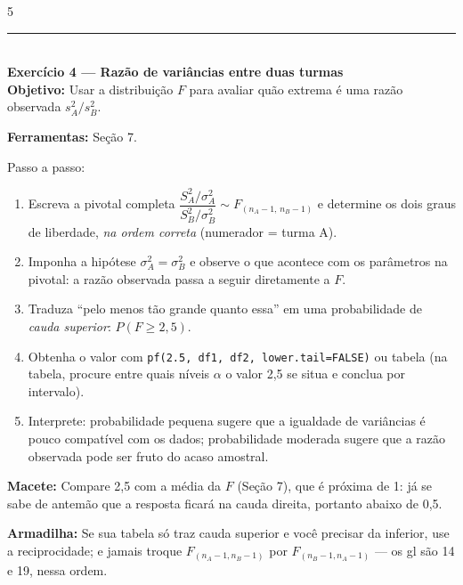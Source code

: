 \documentclass[a4paper,8pt]{extarticle}
\newcommand{\tit}[1]{\vspace{2pt}\textcolor{azul}{\rule{\linewidth}{0.6pt}}\\[1pt]\textbf{\textcolor{azul}{#1}}\\[1pt]}
\newcommand{\mac}[1]{\textcolor{verde}{\textbf{Macete:}} #1\par}
\newcommand{\arm}[1]{\textcolor{vinho}{\textbf{Armadilha:}} #1\par}
\newcommand{\ferr}[1]{\textbf{Ferramentas:} #1\par}
\newcommand{\obj}[1]{\textbf{Objetivo:} #1\par}
\newcommand{\R}[1]{\texttt{\footnotesize #1}}
\begin{document}
\begin{multicols*}{5}
\tit{Exercício 4 — Razão de variâncias entre duas turmas}
\obj{Usar a distribuição $F$ para avaliar quão extrema é uma razão observada $s_A^2/s_B^2$.}
\ferr{Seção 7.}
Passo a passo:
\begin{enumerate}
\item Escreva a pivotal completa $\dfrac{S_A^2/\sigma_A^2}{S_B^2/\sigma_B^2}\sim F_{(n_A-1,\,n_B-1)}$ e determine os dois graus de liberdade, \emph{na ordem correta} (numerador = turma A).
\item Imponha a hipótese $\sigma_A^2=\sigma_B^2$ e observe o que acontece com os parâmetros na pivotal: a razão observada passa a seguir diretamente a $F$.
\item Traduza “pelo menos tão grande quanto essa” em uma probabilidade de \emph{cauda superior}: $P(F\ge 2{,}5)$.
\item Obtenha o valor com \R{pf(2.5, df1, df2, lower.tail=FALSE)} ou tabela (na tabela, procure entre quais níveis $\alpha$ o valor 2,5 se situa e conclua por intervalo).
\item Interprete: probabilidade pequena sugere que a igualdade de variâncias é pouco compatível com os dados; probabilidade moderada sugere que a razão observada pode ser fruto do acaso amostral.
\end{enumerate}
\mac{Compare 2,5 com a média da $F$ (Seção 7), que é próxima de 1: já se sabe de antemão que a resposta ficará na cauda direita, portanto abaixo de 0,5.}
\arm{Se sua tabela só traz cauda superior e você precisar da inferior, use a reciprocidade; e jamais troque $F_{(n_A-1,n_B-1)}$ por $F_{(n_B-1,n_A-1)}$ — os gl são 14 e 19, nessa ordem.}


\end{multicols*}
\end{document}
